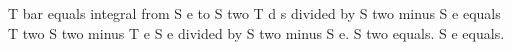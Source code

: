 T bar equals integral from S e to S two T d s divided by S two minus S e equals T two S two minus T e S e divided by S two minus S e. S two equals. S e equals.